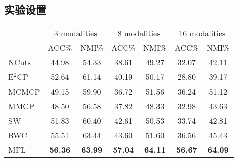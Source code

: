\subsection{实验设置}
\begin{table}[t]
	\label{tab3:modal_corel}
	\centering
	\setlength{\tabcolsep}{8pt}
	\begin{tabular}{l*{6}{c}}
		\toprule
		&\multicolumn{2}{c}{3 modalities} & \multicolumn{2}{c}{8 modalities} & \multicolumn{2}{c}{16 modalities} \\
		\cmidrule(lr){2-3}
		\cmidrule(lr){4-5}
		\cmidrule(lr){6-7}
		& ACC\% & NMI\% & ACC\% & NMI\% & ACC\% & NMI\% \\
		\midrule
		NCuts & 44.98 & 54.33 & 38.61 & 49.27 & 32.07 & 42.11 \\ 
		E$^2$CP & 52.64 & 61.14 & 40.19 & 50.17 & 28.80 & 39.17 \\ 
		MCMCP & 49.15 & 59.90 & 36.72 & 51.56 & 36.24 & 51.12 \\ 
		MMCP & 48.50 & 56.58 & 37.82 & 48.33 & 32.98 & 43.63 \\ 
		\midrule
		SW & 51.83 & 60.40 & 42.61 & 50.53 & 33.74 & 42.81 \\
		RWC & 55.51 & 63.44 & 43.60 & 51.60 & 36.56 & 45.43 \\
		MFL & \textbf{56.36} & \textbf{63.99} & \textbf{57.04} & \textbf{64.11} & \textbf{56.67} &\textbf{ 64.09} \\
		\bottomrule
	\end{tabular}
\end{table}

